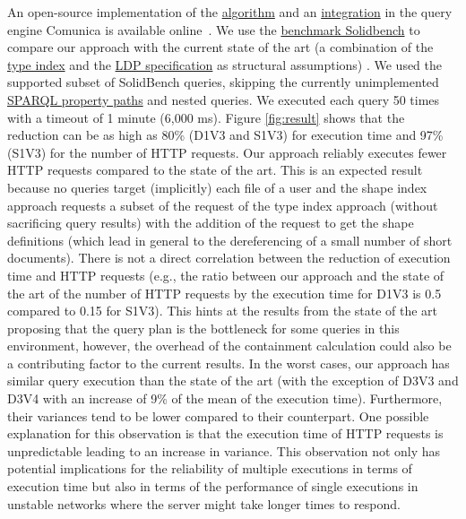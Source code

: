 An open-source implementation of the \href{https://github.com/constraintAutomaton/query-shape-detection}{algorithm} and an 
\href{https://github.com/constraintAutomaton/comunica-feature-link-traversal/tree/feature/shapeIndex}{integration} in the query engine 
Comunica \cite{taelman_iswc_resources_comunica_2018} is available online~.
We use the \href{https://github.com/SolidBench/SolidBench.js}{benchmark Solidbench} \cite{Taelman2023} to compare our approach with the current state of the art 
(a combination of the \href{https://solid.github.io/type-indexes/}{type index} and the \href{https://www.w3.org/TR/ldp/}{LDP specification} as structural assumptions) \cite{Taelman2023}.
We used the supported subset of SolidBench queries, skipping the currently unimplemented \href{https://www.w3.org/TR/sparql11-query/#propertypaths}{SPARQL property paths} and nested queries.
We executed each query 50 times with a timeout of 1 minute (6,000 ms).
Figure \ref{fig:result} shows that the reduction can be as high as 80\% (D1V3 and S1V3) for execution time 
and 97\% (S1V3) for the number of HTTP requests.
Our approach reliably executes fewer HTTP requests compared to the state of the art.
This is an expected result because no queries target (implicitly) each file of a user and the shape index approach requests a subset of the request of the type index approach (without sacrificing query results) with the addition of the request to get the shape definitions (which lead in general to the dereferencing of a small number of short documents).
There is not a direct correlation between the reduction of execution time and HTTP requests (e.g., the ratio 
between our approach and the state of the art of the number of HTTP requests by the execution time for D1V3 is 0.5 compared to 0.15 for S1V3).
This hints at the results from the state of the art \cite{Taelman2023} proposing that the query plan is the bottleneck for some queries in this environment,
however, the overhead of the containment calculation could also be a contributing factor to the current results.
In the worst cases, our approach  has similar query execution than the state of the art (with the exception of D3V3 and D3V4 with an increase of 9\% of the mean of the execution time).
Furthermore, their variances tend to be lower compared to their counterpart. 
One possible explanation for this observation is that the execution time of HTTP requests is unpredictable \cite{hartig2016walking}
leading to an increase in variance.
This observation not only has potential implications for the reliability of multiple executions in terms of execution time
but also in terms of the performance of single executions in unstable networks where the server might take longer times to respond. 

